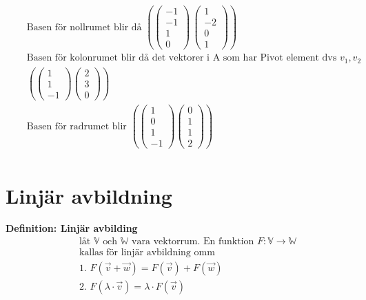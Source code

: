 \begin{align*}
  &\quad  \text{Basen för nollrumet blir då }
  \left( \begin{pmatrix} -1 \\ -1 \\ 1 \\ 0 \end{pmatrix} \, \begin{pmatrix} 1 \\ -2 \\ 0 \\ 1 \end{pmatrix} \right)  \\
  &\quad  \text{Basen för kolonrumet blir då det vektorer i A som har Pivot element dvs } v_1, v_2 \\
  &\quad
  \left( \begin{pmatrix} 1 \\ 1 \\ -1 \end{pmatrix} \begin{pmatrix} 2 \\ 3 \\ 0 \end{pmatrix} \right) \\
  &\quad  \text{Basen för radrumet blir }
  \left( \begin{pmatrix} 1 \\ 0 \\ 1 \\ -1 \end{pmatrix} \begin{pmatrix} 0 \\ 1 \\ 1 \\ 2 \end{pmatrix} \right) \\
\end{align*}


\section{Linjär avbildning}
\textbf{Definition: Linjär avbilding}
\begin{align*}
  &\quad  \text{låt $\mathbb{V}$ och $\mathbb{W}$ vara vektorrum. En funktion } F:\mathbb{V}\to\mathbb{W} \\
  &\quad  \text{kallas för linjär avbildning omm} \\
  &\quad  \text{1. } F(\vec{v}+\vec{w}) = F(\vec{v}) + F(\vec{w}) \\
  &\quad  \text{2. } F(\lambda\cdot\vec{v}) = \lambda\cdot F(\vec{v}) \\
\end{align*}

